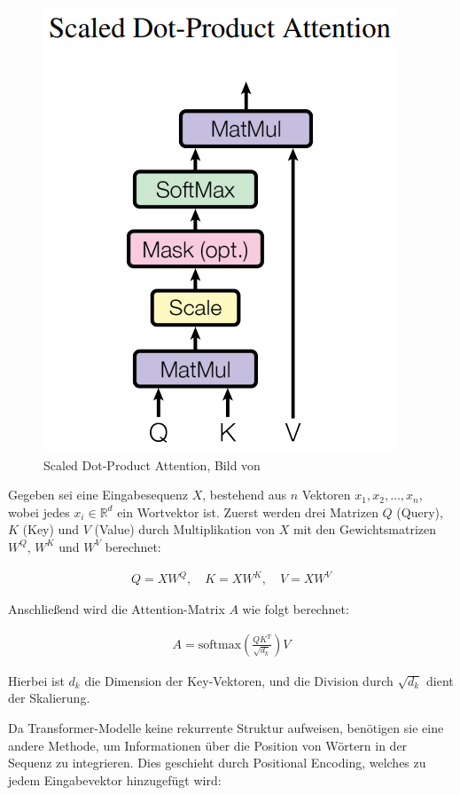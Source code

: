 \documentclass[nolibertine, ngerman, algorithm, nomencl, minted]{ttlab-qualify}
\begin{document}
\begin{figure}[h]
	\centering
	\includegraphics[scale=0.4]{static/attention.png}
	\caption{Scaled Dot-Product Attention, Bild von \parencite[4]{vaswani2017attention}}
	\label{fig:2.5}
\end{figure}

Gegeben sei eine Eingabesequenz $X$, bestehend aus $n$ Vektoren $x_1, x_2, \ldots, x_n$, 
wobei jedes $x_i \in \mathbb{R}^d$ ein Wortvektor ist. Zuerst werden drei Matrizen $Q$ (Query), 
$K$ (Key) und $V$ (Value) durch Multiplikation von $X$ mit den Gewichtsmatrizen $W^Q$, $W^K$ und $W^V$ berechnet:

\begin{align*}
	Q = XW^Q, \quad
	K = XW^K, \quad
	V = XW^V
\end{align*}
	
Anschließend wird die Attention-Matrix $A$ wie folgt berechnet:
	
\begin{align*}
	A = \text{softmax}\left(\frac{QK^T}{\sqrt{d_k}}\right)V
\end{align*}
	
Hierbei ist $d_k$ die Dimension der Key-Vektoren, und die Division durch $\sqrt{d_k}$ dient der Skalierung.

Da Transformer-Modelle keine rekurrente Struktur aufweisen, benötigen sie eine andere Methode, um Informationen über 
die Position von Wörtern in der Sequenz zu integrieren. Dies geschieht durch Positional Encoding, welches zu jedem Eingabevektor 
hinzugefügt wird:
\end{document}
